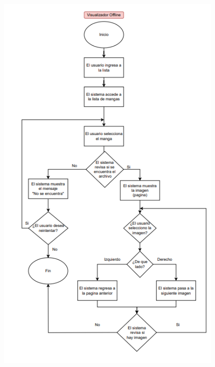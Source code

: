 \documentclass[12pt]{article}
\begin{document}
\begin{figure}[htbp]
	\centering
		\includegraphics[width=1.00\textwidth]{Screenshot 2023-10-05 114539.png}
	\label{fig:Screenshot 2023-10-05 114539}
\end{figure}
\end{document}
